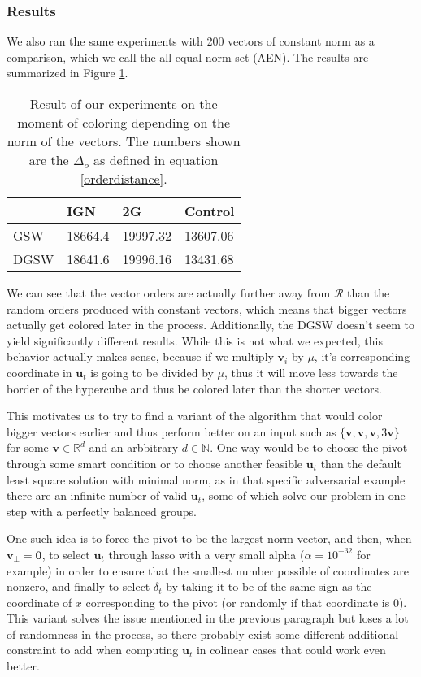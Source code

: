 \documentclass[12pt]{article}
\begin{document}
\subsubsection{Results}
We also ran the same experiments with 200 vectors of constant norm as a comparison, which we call the all equal norm set (AEN). The results are summarized in Figure \ref{norm_when_colored}.
\begin{center}
\begin{table}[h]
\begin{tabular}{l|lll}
& IGN & 2G & Control  \\
\hline
GSW & 18664.4 & 19997.32 & 13607.06 \\
DGSW & 18641.6 & 19996.16 & 13431.68
\end{tabular}
\caption{Result of our experiments on the moment of coloring depending on the norm of the vectors. The numbers shown are the $\Delta_o$ as defined in equation \ref{orderdistance}.}
\label{norm_when_colored}
\end{table}
\end{center}
We can see that the vector orders are actually further away from $\mathcal{R}$ than the random orders produced with constant vectors, which means that bigger vectors actually get colored later in the process. Additionally, the DGSW doesn't seem to yield significantly different results. While this is not what we expected, this behavior actually makes sense, because if we multiply $\textbf{v}_i$ by $\mu%
$, it's corresponding coordinate in $\textbf{u}_t$ is going to be divided by $\mu$, thus it will move less towards the border of the hypercube and thus be colored later than the shorter vectors.

This motivates us to try to find a variant of the algorithm that would color bigger vectors earlier and thus perform better on an input such as $\{\textbf{v},\textbf{v},\textbf{v},3\textbf{v}\}$ for some $\textbf{v}\in\mathbb{R}^d$ and an arbbitrary $d\in\mathbb{N}$. One way would be to choose the pivot through some smart condition or to choose another feasible $\textbf{u}_t$ than the default least square solution with minimal norm, as in that specific adversarial example there are an infinite number of valid $\textbf{u}_t$, some of which solve our problem in one step with a perfectly balanced groups.

One such idea is to force the pivot to be the largest norm vector, and then, when $\textbf{v}_\perp=\textbf{0}$, to select $\textbf{u}_t$ through lasso with a very small alpha ($\alpha=10^{-32}$ for example) in order to ensure that the smallest number possible of coordinates are nonzero, and finally to select $\delta_t$ by taking it to be of the same sign as the coordinate of $x$ corresponding to the pivot (or randomly if that coordinate is 0). This variant solves the issue mentioned in the previous paragraph but loses a lot of randomness in the process, so there probably exist some different additional constraint to add when computing $\textbf{u}_t$ in colinear cases that could work even better.
\end{document}
